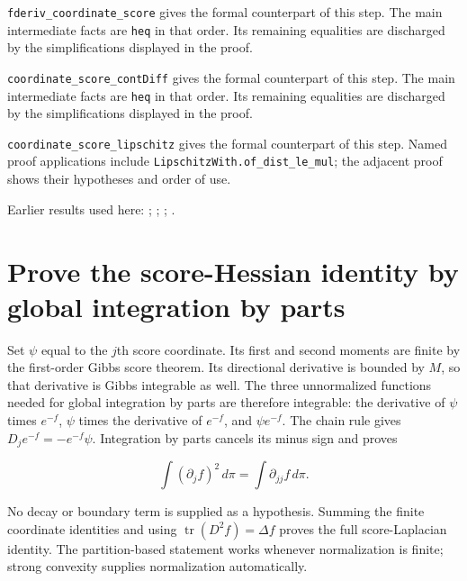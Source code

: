 \documentclass[11pt,a4paper]{article}
\begin{document}
\begin{leanbox}
\texttt{fderiv\_\allowbreak{}coordinate\_\allowbreak{}score} gives the formal counterpart of this step. The main intermediate facts are \texttt{heq} in that order. Its remaining equalities are discharged by the simplifications displayed in the proof.




\texttt{coordinate\_\allowbreak{}score\_\allowbreak{}cont\allowbreak{}Diff} gives the formal counterpart of this step. The main intermediate facts are \texttt{heq} in that order. Its remaining equalities are discharged by the simplifications displayed in the proof.




\texttt{coordinate\_\allowbreak{}score\_\allowbreak{}lipschitz} gives the formal counterpart of this step. Named proof applications include \texttt{Lipschitz\allowbreak{}With.\allowbreak{}of\_\allowbreak{}dist\_\allowbreak{}le\_\allowbreak{}mul}; the adjacent proof shows their hypotheses and order of use.
\end{leanbox}


Earlier results used here: \cite[Section~3.26.1]{LangevinLean2026ULASC}; \cite[Section~3.26.2]{LangevinLean2026ULASC}; \cite[Section~3.26.3]{LangevinLean2026ULASC}; \cite[Section~3.26.9]{LangevinLean2026ULASC}.

\section{\texorpdfstring{Prove the score-Hessian identity by global integration by parts}{Prove the score-Hessian identity by global integration by parts}}


Set \(\psi\) equal to the \(j\)th score coordinate. Its first and second moments are finite by the first-order Gibbs score theorem. Its directional derivative is bounded by \(M\), so that derivative is Gibbs integrable as well. The three unnormalized functions needed for global integration by parts are therefore integrable: the derivative of \(\psi\) times \(e^{-f}\), \(\psi\) times the derivative of \(e^{-f}\), and \(\psi e^{-f}\). The chain rule gives \(D_je^{-f}=-e^{-f}\psi\). Integration by parts cancels its minus sign and proves

\[\int(\partial_j f)^2\,d\pi=\int\partial_{jj}f\,d\pi.\]

No decay or boundary term is supplied as a hypothesis. Summing the finite coordinate identities and using \(\operatorname{tr}(D^2f)=\Delta f\) proves the full score-Laplacian identity. The partition-based statement works whenever normalization is finite; strong convexity supplies normalization automatically.
\end{document}
